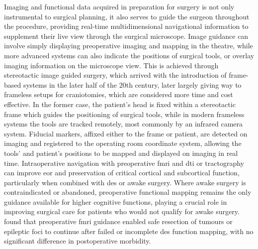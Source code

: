 Imaging and functional data acquired in preparation for surgery is not only instrumental to surgical planning, it also serves to guide the surgeon throughout the procedure, providing real-time multidimensional navigational information to supplement their live view through the surgical microscope.
Image guidance can involve simply displaying preoperative imaging and mapping in the theatre, while more advanced systems can also indicate the positions of surgical tools, or overlay imaging information on the microscope view.
This is achieved through stereotactic image guided surgery, which arrived with the introduction of frame-based systems in the later half of the 20th century, later largely giving way to frameless setups for craniotomies\autocite{Sandeman1995}, which are considered more time and cost effective\autocite{Sattur2019}.
In the former case, the patient's head is fixed within a stereotactic frame which guides the positioning of surgical tools, while in modern frameless systems the tools are tracked remotely, most commonly by an infrared camera system\autocite{Sattur2019}.
Fiducial markers, affixed either to the frame or patient, are detected on imaging and registered to the operating room coordinate system, allowing the tools' and patient's positions to be mapped and displayed on imaging in real time.
Intraoperative navigation with preoperative \gls{fmri} and \gls{dti} or tractography can improve \gls{eor} and preservation of critical cortical and subcortical function\autocite{Wu2007,Bello2008,Bello2010d}, particularly when combined with \gls{des} or awake surgery\autocite{Aibar-Duran2020}.
Where awake surgery is contraindicated or abandoned, preoperative functional mapping remains the only guidance available for higher cognitive functions, playing a crucial role in improving surgical care for patients who would not qualify for awake surgery.
\textcite{Rigolo2020a} found that preoperative \gls{fmri} guidance enabled safe resection of tumours or epileptic foci to continue after failed or incomplete \gls{des} function mapping, with no significant difference in postoperative morbidity.

